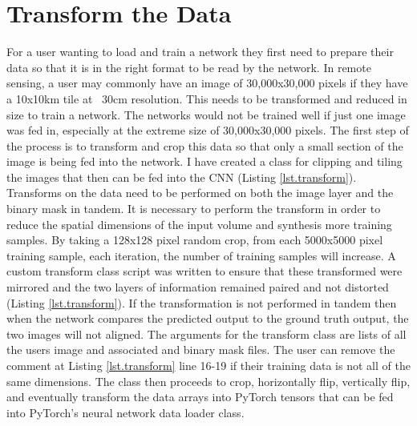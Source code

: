 \section{Transform the Data}
For a user wanting to load and train a network they first need to prepare their data so that it is in the right format to be read by the network. In remote sensing, a user may commonly have an image of 30,000x30,000 pixels if they have a 10x10km tile at ~30cm resolution. This needs to be transformed and reduced in size to train a network. The networks would not be trained well if just one image was fed in, especially at the extreme size of 30,000x30,000 pixels. The first step of the process is to transform and crop this data so that only a small section of the image is being fed into the network. I have created a class for clipping and tiling the images that then can be fed into the CNN (Listing \ref{lst.transform}).
Transforms on the data need to be performed on both the image layer and the binary mask in tandem. It is necessary to perform the transform in order to reduce the spatial dimensions of the input volume and synthesis more training samples. By taking a 128x128 pixel random crop, from each 5000x5000 pixel training sample, each iteration, the number of training samples will increase. A custom transform class script was written to ensure that these transformed were mirrored and the two layers of information remained paired and not distorted (Listing \ref{lst.transform}). If the transformation is not performed in tandem then when the network compares the predicted output to the ground truth output, the two images will not aligned.
The arguments for the transform class are lists of all the users image and associated and binary mask files. The user can remove the comment at Listing \ref{lst.transform} line 16-19 if their training data is not all of the same dimensions. The class then proceeds to crop, horizontally flip, vertically flip, and eventually transform the data arrays into PyTorch tensors that can be fed into PyTorch's neural network data loader class. 
\par 
